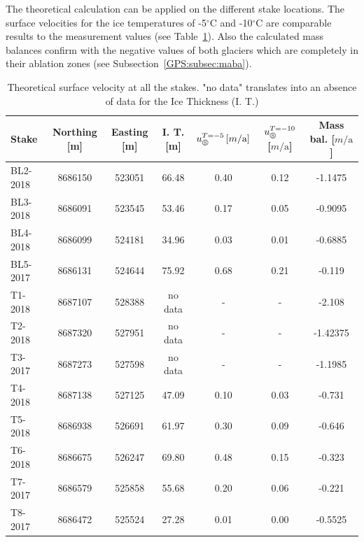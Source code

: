 The theoretical calculation can be applied on the different stake locations.
The surface velocities for the ice temperatures of -5$^\circ$C and -10$^\circ$C are comparable results to the measurement values (see Table~\ref{GPS:tab:stakesvelocities}).
Also the calculated mass balances confirm with the negative values of both glaciers which are completely in their ablation zones (see Subsection~\ref{GPS:subsec:maba}). 

\begin{table}[htb]
    \centering
    
    \footnotesize
    \caption{Theoretical surface velocity at all the stakes. "no data" translates into an absence of data for the Ice Thickness (I. T.)}
	\begin{tabular}{lcccccc}
	\toprule
Stake & Northing [m] & Easting [m] & I. T. [m] & $u_\circledS^{T=-5}\,[m / \text{a}]$ & $u_\circledS^{T=-10}$ [$m / \text{a}$] & Mass bal. [$m / \text{a}$]\\
\midrule
BL2-2018 & 8686150 & 523051 & 66.48 & 0.40 & 0.12 & -1.1475\\
BL3-2018 & 8686091 & 523545 & 53.46 & 0.17 & 0.05 & -0.9095\\
BL4-2018 & 8686099 & 524181 & 34.96 & 0.03 & 0.01 & -0.6885\\
BL5-2017 & 8686131 & 524644 & 75.92 & 0.68 & 0.21 & -0.119\\
T1-2018 & 8687107 & 528388 & no data & - & - & -2.108\\
T2-2018 & 8687320 & 527951 & no data & - & - & -1.42375\\
T3-2017 & 8687273 & 527598 & no data & - & - & -1.1985\\
T4-2018 & 8687138 & 527125 & 47.09 & 0.10 & 0.03 & -0.731\\
T5-2018 & 8686938 & 526691 & 61.97 & 0.30 & 0.09 & -0.646\\
T6-2018 & 8686675 & 526247 & 69.80 & 0.48 & 0.15 & -0.323\\
T7-2017 & 8686579 & 525858 & 55.68 & 0.20 & 0.06 & -0.221\\
T8-2017 & 8686472 & 525524 & 27.28 & 0.01 & 0.00 & -0.5525\\
\bottomrule
	\end{tabular}
	\label{GPS:tab:stakesvelocities}
\end{table}
\FloatBarrier
